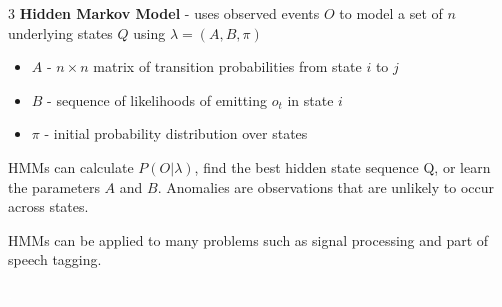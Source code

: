 \documentclass[10pt,landscape]{article}
\begin{document}
\begin{multicols}{3}
        \textbf{Hidden Markov Model} - uses observed events $O$ to model a set of $n$ underlying states $Q$ using $\lambda = (A,B,\pi)$
        \begin{itemize}[label={--},leftmargin=4mm]
            \itemsep -.4mm
            \item $A$ - $n\times n$ matrix of transition probabilities from state $i$ to $j$ \item $B$ - sequence of likelihoods of emitting $o_t$ in state $i$
            \item $\pi$ - initial probability distribution over states
        \end{itemize}
        HMMs can calculate $P(O|\lambda)$, find the best hidden state sequence Q, or learn the parameters $A$ and $B$.
        Anomalies are observations that are unlikely to occur across states.

        \smallskip
        HMMs can be applied to many problems such as signal processing and part of speech tagging.

        \textcolor{white}{.}\vspace{-5mm}\\ %

\end{multicols}
\end{document}
